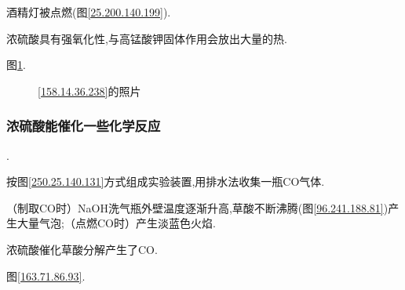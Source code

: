 \documentclass[hyperref,UTF8]{ctexart}
\begin{document}
酒精灯被点燃(图\ref{25.200.140.199}).

浓硫酸具有强氧化性,与高锰酸钾固体作用会放出大量的热.

图\ref{157.9.160.83}.

\begin{figure}[h]
    \centering
    \caption{\ref{158.14.36.238}的照片}
    \label{157.9.160.83}
\end{figure}

\subsubsection{浓硫酸能催化一些化学反应}\label{73.107.104.102}

.

按图\ref{250.25.140.131}方式组成实验装置,用排水法收集一瓶CO气体.

（制取CO时）NaOH洗气瓶外壁温度逐渐升高,草酸不断沸腾(图\ref{96.241.188.81})产生大量气泡;（点燃CO时）产生淡蓝色火焰.

浓硫酸催化草酸分解产生了CO.

图\ref{163.71.86.93}.
\end{document}
